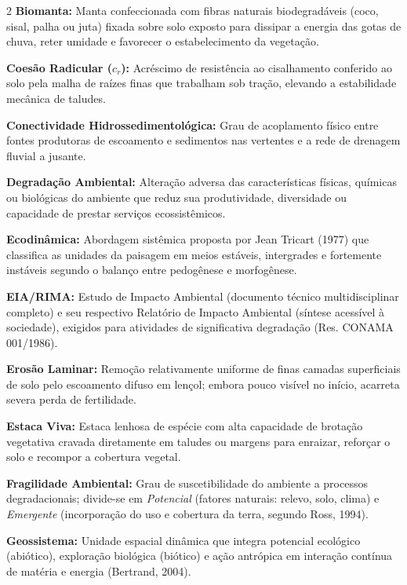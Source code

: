 \begin{multicols}{2}
\noindent\textbf{\color{uefsNavy}Biomanta:} Manta confeccionada com fibras naturais biodegradáveis (coco, sisal, palha ou juta) fixada sobre solo exposto para dissipar a energia das gotas de chuva, reter umidade e favorecer o estabelecimento da vegetação.

\noindent\textbf{\color{uefsNavy}Coesão Radicular ($c_r$):} Acréscimo de resistência ao cisalhamento conferido ao solo pela malha de raízes finas que trabalham sob tração, elevando a estabilidade mecânica de taludes.

\noindent\textbf{\color{uefsNavy}Conectividade Hidrossedimentológica:} Grau de acoplamento físico entre fontes produtoras de escoamento e sedimentos nas vertentes e a rede de drenagem fluvial a jusante.

\noindent\textbf{\color{uefsNavy}Degradação Ambiental:} Alteração adversa das características físicas, químicas ou biológicas do ambiente que reduz sua produtividade, diversidade ou capacidade de prestar serviços ecossistêmicos.

\noindent\textbf{\color{uefsNavy}Ecodinâmica:} Abordagem sistêmica proposta por Jean Tricart (1977) que classifica as unidades da paisagem em meios estáveis, intergrades e fortemente instáveis segundo o balanço entre pedogênese e morfogênese.

\noindent\textbf{\color{uefsNavy}EIA/RIMA:} Estudo de Impacto Ambiental (documento técnico multidisciplinar completo) e seu respectivo Relatório de Impacto Ambiental (síntese acessível à sociedade), exigidos para atividades de significativa degradação (Res. CONAMA 001/1986).

\noindent\textbf{\color{uefsNavy}Erosão Laminar:} Remoção relativamente uniforme de finas camadas superficiais de solo pelo escoamento difuso em lençol; embora pouco visível no início, acarreta severa perda de fertilidade.

\noindent\textbf{\color{uefsNavy}Estaca Viva:} Estaca lenhosa de espécie com alta capacidade de brotação vegetativa cravada diretamente em taludes ou margens para enraizar, reforçar o solo e recompor a cobertura vegetal.

\noindent\textbf{\color{uefsNavy}Fragilidade Ambiental:} Grau de suscetibilidade do ambiente a processos degradacionais; divide-se em \textit{Potencial} (fatores naturais: relevo, solo, clima) e \textit{Emergente} (incorporação do uso e cobertura da terra, segundo Ross, 1994).

\noindent\textbf{\color{uefsNavy}Geossistema:} Unidade espacial dinâmica que integra potencial ecológico (abiótico), exploração biológica (biótico) e ação antrópica em interação contínua de matéria e energia (Bertrand, 2004).


\end{multicols}
